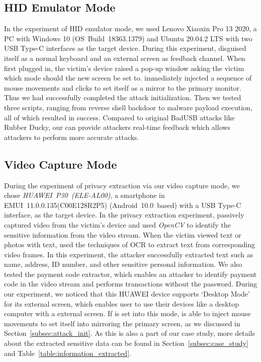 \subsection{HID Emulator Mode}

In the experiment of HID emulator mode, we used {Lenovo Xiaoxin Pro 13
2020}, a PC with Windows 10 \mbox{(OS Build 18363.1379)} and Ubuntu 20.04.2 LTS with two \ac{USB} Type-C interfaces as the
target device. During this experiment, \tool disguised itself as a normal keyboard and an external screen as feedback channel. When first plugged in, the victim's device raised a pop-up window asking the victim which mode should the new screen be set to. \tool immediately injected a sequence of mouse movements and clicks to set itself as a mirror to the primary monitor. Thus we had successfully completed the attack initialization. Then we tested three scripts, ranging from reverse shell backdoor to malware payload execution, all of which resulted in success. Compared to original BadUSB attacks like Rubber Ducky, our \tool can provide attackers real-time feedback which allows attackers to perform more accurate attacks.


\subsection{Video Capture Mode}

During the experiment of privacy extraction via our video capture mode, we chose \mbox{\textit{HUAWEI P30 (ELE-AL00)}}, a
smartphone in \mbox{EMUI 11.0.0.135(C00E128R2P5)} \mbox{(Android 10.0 based)} with a \ac{USB} Type-C interface, as the
target device. In the privacy extraction experiment, \tool passively captured video
from the victim's device and used \textit{OpenCV} to identify the sensitive
information from the video stream.  When the victim viewed text or photos with
text, \tool used the techniques of \ac{OCR}  to
extract text from corresponding video frames. In this experiment, the attacker
successfully extracted text such as name, address, ID number, and other sensitive
personal information. We also tested the payment code extractor, which enables
an attacker to identify payment code in the video stream and performs transactions
without the password. During our experiment, we noticed that this HUAWEI device supports `Desktop Mode'
for its external screen, which enables user to use their devices like a desktop computer with a external screen.
If \tool is set into this mode, \tool is able to inject mouse movements to set itself into mirroring the primary screen, as we discussed in Section~\ref{subsec:attack_init}.
As this is also a part of our case study, more details about
the extracted sensitive data can be found in Section~\ref{subsec:case_study} and
Table~\ref{table:information_extracted}.


